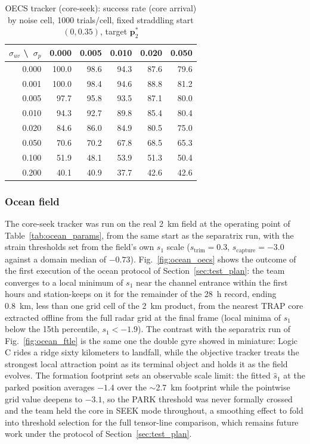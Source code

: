 \documentclass[lettersize,journal]{IEEEtran}
\begin{document}
\begin{table}[!t]
\centering
\caption{OECS tracker (core-seek): success rate (core arrival) by noise
cell, 1000 trials/cell, fixed straddling start $(0, 0.35)$, target
$\mathbf{p}^*_2$}
\label{tab:oecs_success}
\footnotesize
\setlength{\tabcolsep}{4pt}
\begin{tabular}{r|rrrrr}
\hline
$\sigma_{uv}$ \textbackslash\ $\sigma_p$ & 0.000 & 0.005 & 0.010 & 0.020 & 0.050 \\
\hline
0.000 & 100.0 & 98.6 & 94.3 & 87.6 & 79.6 \\
0.001 & 100.0 & 98.4 & 94.6 & 88.8 & 81.2 \\
0.005 &  97.7 & 95.8 & 93.5 & 87.1 & 80.0 \\
0.010 &  94.3 & 92.7 & 89.8 & 85.4 & 80.4 \\
0.020 &  84.6 & 86.0 & 84.9 & 80.5 & 75.0 \\
0.050 &  70.6 & 70.2 & 67.8 & 68.5 & 65.3 \\
0.100 &  51.9 & 48.1 & 53.9 & 51.3 & 50.4 \\
0.200 &  40.1 & 40.9 & 37.7 & 42.6 & 42.6 \\
\hline
\end{tabular}
\end{table}

\subsubsection{Ocean field}
The core-seek tracker was run on the real 2~km field at the operating
point of Table~\ref{tab:ocean_params}, from the same start as the
separatrix run, with the strain thresholds set from the field's own
$s_1$ scale ($s_{\text{trim}} = 0.3$, $s_{\text{capture}} = -3.0$
against a domain median of $-0.73$). Fig.~\ref{fig:ocean_oecs} shows
the outcome of the first execution of the ocean protocol of
Section~\ref{sec:test_plan}: the team converges to a local minimum of
$s_1$ near the channel entrance within the first hours and
station-keeps on it for the remainder of the 28~h record, ending
0.8~km, less than one grid cell of the 2~km product, from the nearest
TRAP core extracted offline from the full radar grid at the final
frame (local minima of $s_1$ below the 15th percentile, $s_1 <
-1.9$). The contrast with the separatrix run of
Fig.~\ref{fig:ocean_ftle} is the same one the double gyre showed in
miniature: Logic C rides a ridge sixty kilometers to landfall, while
the objective tracker treats the strongest local attraction point as
its terminal object and holds it as the field evolves. The formation
footprint sets an observable scale limit: the fitted $\hat{s}_1$ at
the parked position averages $-1.4$ over the $\sim$2.7~km footprint
while the pointwise grid value deepens to $-3.1$, so the PARK
threshold was never formally crossed and the team held the core in
SEEK mode throughout, a smoothing effect to fold into threshold
selection for the full tensor-line comparison, which remains future
work under the protocol of Section~\ref{sec:test_plan}.
\end{document}
